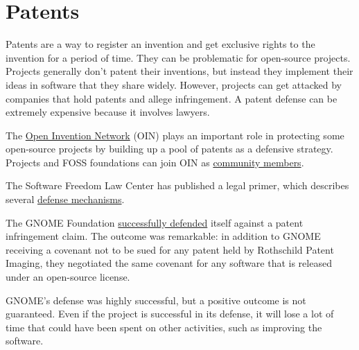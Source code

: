 


\chapter{Patents}

Patents are a way to register an invention and get exclusive rights to the invention for a period of time.  They can be problematic for open-source projects.  Projects generally don't patent their inventions, but instead they implement their ideas in software that they share widely.  However, projects can get attacked by companies that hold patents and allege infringement.  A patent defense can be extremely expensive because it involves lawyers.

The \href{https://openinventionnetwork.com/}{Open Invention Network} (OIN) plays an important role in protecting some open-source projects by building up a pool of patents as a defensive strategy.  Projects and FOSS foundations can join OIN as \href{https://openinventionnetwork.com/our-members/community-members/}{community members}.

The Software Freedom Law Center has published a legal primer, which describes several \href{http://www.softwarefreedom.org/resources/2008/foss-primer.html#x1-390004}{defense mechanisms}.

\begin{kaobox}[frametitle=Patent case against GNOME]

The GNOME Foundation \href{https://foundation.gnome.org/2020/05/20/patent-case-against-gnome-resolved/}{successfully defended} itself against a patent infringement claim.  The outcome was remarkable: in addition to GNOME receiving a covenant not to be sued for any patent held by Rothschild Patent Imaging, they negotiated the same covenant for any software that is released under an open-source license.

GNOME's defense was highly successful, but a positive outcome is not guaranteed.  Even if the project is successful in its defense, it will lose a lot of time that could have been spent on other activities, such as improving the software.

\end{kaobox}

